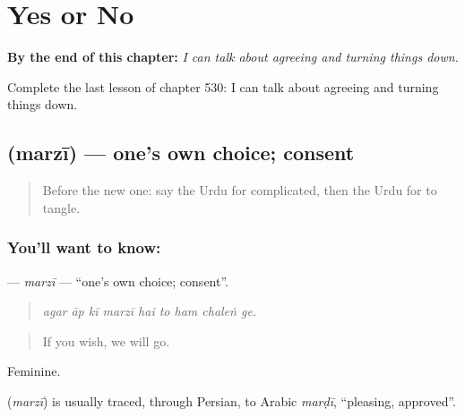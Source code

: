 
\chapter{Yes or No}
\label{ch:ur-yes-or-no}

\begin{chapteropening}
\textbf{By the end of this chapter:} \emph{I can talk about agreeing and turning things down.}

Complete the last lesson of chapter 530: I can talk about agreeing and turning things down.
\end{chapteropening}

\section[\texorpdfstring{\ur{مرضی} (marzī)}{مرضی (marzī)}]{ (marzī) — one's own choice; consent}

\label{lesson:UR-C530-marzi}



\begin{quote}
Before the new one: say the Urdu for complicated, then the Urdu for to tangle.
\end{quote}

\subsection*{You'll want to know: }
\textbf{} — \emph{marzī} — \textquotedblleft{}one's own choice; consent\textquotedblright{}.

\begin{quote}
        
\end{quote}

\begin{quote}
\emph{agar āp kī marzī hai to ham chaleṅ ge.}
\end{quote}

\begin{quote}
If you wish, we will go.
\end{quote}

Feminine.

\begin{cousinweb}
\textbf{} (\emph{marzī}) is usually traced, through Persian, to Arabic \emph{marḍī}, \textquotedblleft{}pleasing, approved\textquotedblright{}.
\end{cousinweb}

